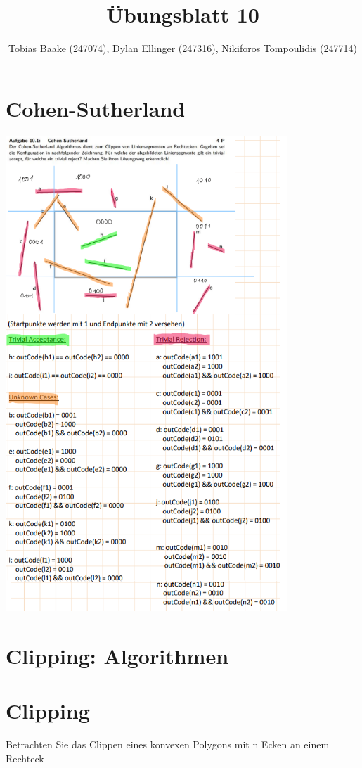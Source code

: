 \documentclass{article}
\title{Übungsblatt 10}
\author{Tobias Baake (247074), Dylan Ellinger (247316), Nikiforos Tompoulidis (247714)}
\begin{document}
\maketitle

\section{Cohen-Sutherland}
\includegraphics[width=300pt]{./files/Übung10.1.png}

\section{Clipping: Algorithmen}

\section{Clipping}

Betrachten Sie das Clippen eines konvexen Polygons mit n Ecken an einem Rechteck
\end{document}
